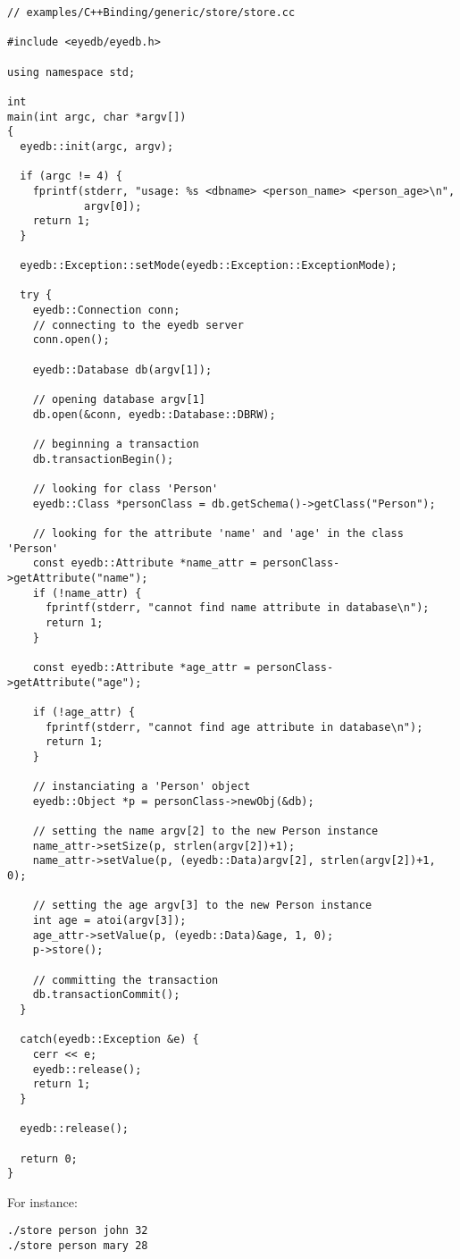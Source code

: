 \begin{verbatim}
// examples/C++Binding/generic/store/store.cc

#include <eyedb/eyedb.h>

using namespace std;

int
main(int argc, char *argv[])
{
  eyedb::init(argc, argv);

  if (argc != 4) {
    fprintf(stderr, "usage: %s <dbname> <person_name> <person_age>\n",
            argv[0]);
    return 1;
  }

  eyedb::Exception::setMode(eyedb::Exception::ExceptionMode);

  try {
    eyedb::Connection conn;
    // connecting to the eyedb server
    conn.open();

    eyedb::Database db(argv[1]);

    // opening database argv[1]
    db.open(&conn, eyedb::Database::DBRW);

    // beginning a transaction
    db.transactionBegin();

    // looking for class 'Person'
    eyedb::Class *personClass = db.getSchema()->getClass("Person");

    // looking for the attribute 'name' and 'age' in the class 'Person'
    const eyedb::Attribute *name_attr = personClass->getAttribute("name");
    if (!name_attr) {
      fprintf(stderr, "cannot find name attribute in database\n");
      return 1;
    }

    const eyedb::Attribute *age_attr = personClass->getAttribute("age");

    if (!age_attr) {
      fprintf(stderr, "cannot find age attribute in database\n");
      return 1;
    }

    // instanciating a 'Person' object
    eyedb::Object *p = personClass->newObj(&db);

    // setting the name argv[2] to the new Person instance
    name_attr->setSize(p, strlen(argv[2])+1);
    name_attr->setValue(p, (eyedb::Data)argv[2], strlen(argv[2])+1, 0);

    // setting the age argv[3] to the new Person instance
    int age = atoi(argv[3]);
    age_attr->setValue(p, (eyedb::Data)&age, 1, 0);
    p->store();

    // committing the transaction
    db.transactionCommit();
  }

  catch(eyedb::Exception &e) {
    cerr << e;
    eyedb::release();
    return 1;
  }

  eyedb::release();

  return 0;
}
\end{verbatim}
For instance:
\begin{verbatim}
./store person john 32
./store person mary 28
\end{verbatim}


